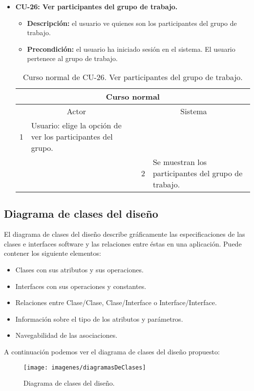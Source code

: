 \begin{itemize}
	\item \textbf{CU-26: Ver participantes del grupo de trabajo.}
	\begin{itemize}
		\item \textbf{Descripción:} el usuario ve quienes son los participantes del grupo de trabajo.
		\item \textbf{Precondición:} el usuario ha iniciado sesión en el sistema. El usuario pertenece al grupo de trabajo.
	\end{itemize}
	\begin{table}[H]
		\centering
		\begin{tabular}{|p{0.3cm}|p{5cm}|p{0.3cm}|p{5cm}|}
			\hline
			\multicolumn{4}{|c|}{Curso normal} \\ \hline
			\multicolumn{2}{|c|}{Actor} & \multicolumn{2}{|c|}{Sistema} \\ \hline
			1 & Usuario: elige la opción de ver los participantes del grupo. &  &  \\ \hline
			&  & 2 & Se muestran los participantes del grupo de trabajo. \\ \hline
		\end{tabular}
		\caption{Curso normal de CU-26. Ver participantes del grupo de trabajo.}
		\label{tabla:cu26-normal}
	\end{table}
\end{itemize}

\subsection{Diagrama de clases del diseño}
El diagrama de clases del diseño describe gráficamente las especificaciones de las clases e interfaces software y las relaciones entre éstas en una aplicación. Puede contener los siguiente elementos:
\begin{itemize}
	\item Clases con sus atributos y sus operaciones.
	\item Interfaces con sus operaciones y constantes.
	\item Relaciones entre Clase/Clase, Clase/Interface o Interface/Interface.
	\item Información sobre el tipo de los atributos y parámetros.
	\item Navegabilidad de las asociaciones.
\end{itemize}

A continuación podemos ver el diagrama de clases del diseño propuesto:

\begin{figure}[H]
	\centering
	\texttt{[image: imagenes/diagramasDeClases]}
	\caption{Diagrama de clases del diseño.}
	\label{fig:diagramasDeClases}
\end{figure}

